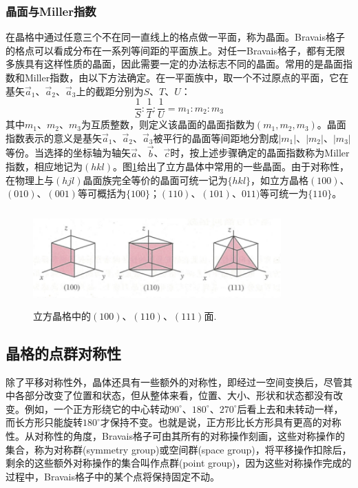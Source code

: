 \subsubsection{晶面与Miller指数}\label{sub:Crystal_Plane} 
在晶格中通过任意三个不在同一直线上的格点做一平面，称为晶面。Bravais格子的格点可以看成分布在一系列等间距的平面族上。对任一Bravais格子，都有无限多族具有这样性质的晶面，因此需要一定的办法标志不同的晶面。常用的是晶面指数和Miller指数，由以下方法确定。在一平面族中，取一个不过原点的平面，它在基矢$\vec a_1$、$\vec a_2$、$\vec a_3$上的截距分别为$S$、$T$、$U$：
\begin{equation}
	\frac1S:\frac1T:\frac1U=m_1:m_2:m_3
	\label{eq:SSI-10}
\end{equation} 
其中$m_1$、$m_2$、$m_3$为互质整数，则定义该晶面的晶面指数为$(m_1,m_2,m_3)$。晶面指数表示的意义是基矢$\vec a_1$、$\vec a_2$、$\vec a_3$被平行的晶面等间距地分割成$|m_1|$、$|m_2|$、$|m_3|$等份。当选择的坐标轴为轴矢$\vec a$、$\vec b$、$\vec c$时，按上述步骤确定的晶面指数称为Miller指数，相应地记为$(hkl)$。图\ref{Fig:Cubic_plane}给出了立方晶体中常用的一些晶面。由于对称性，在物理上与$(hjl)$晶面族完全等价的晶面可统一记为$\{hkl\}$，如立方晶格$(100)$、$(010)$、$(001)$等可概括为$\{100\}$；$(110)$、$(101)$、$011)$等可统一为$\{110\}$。
\begin{figure}[h!]
\centering
\vspace*{-0.05in}
\includegraphics[height=1.45in,width=3.75in,viewport=0 0 92 33,clip]{Figures/Cubic_Plane.png}
\caption{\small \textrm{立方晶格中的$(100)$、$(110)$、$(111)$面.}}%
\label{Fig:Cubic_plane}
\end{figure}


\subsection{晶格的点群对称性} 
除了平移对称性外，晶体还具有一些额外的对称性，即经过一空间变换后，尽管其中各部分改变了位置和状态，但从整体来看，位置、大小、形状和状态都没有改变。例如，一个正方形绕它的中心转动$90^{\circ}$、$180^{\circ}$、$270^{\circ}$后看上去和未转动一样，而长方形只能旋转$180^{\circ}$才保持不变。也就是说，正方形比长方形具有更高的对称性。从对称性的角度，Bravais格子可由其所有的对称操作刻画，这些对称操作的集合，称为对称群(symmetry group)或空间群(space group)，将平移操作扣除后，剩余的这些额外对称操作的集合叫作点群(point group)，因为这些对称操作完成的过程中，Bravais格子中的某个点将保持固定不动。

